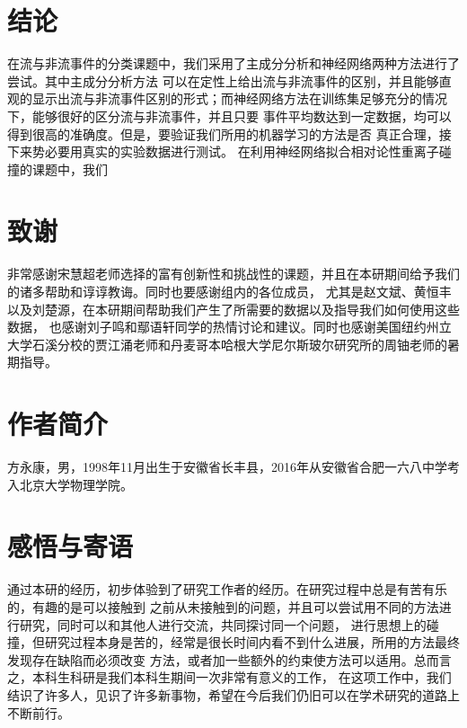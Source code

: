 \documentclass[aps,pre,12pt,preprint,onecolumn,showpacs,showkeys]{revtex4-1}
\begin{document}
\section{结论}
在流与非流事件的分类课题中，我们采用了主成分分析和神经网络两种方法进行了尝试。其中主成分分析方法
可以在定性上给出流与非流事件的区别，并且能够直观的显示出流与非流事件区别的形式；而神经网络方法在训练集足够充分的情况下，能够很好的区分流与非流事件，并且只要
事件平均数达到一定数据，均可以得到很高的准确度。但是，要验证我们所用的机器学习的方法是否
真正合理，接下来势必要用真实的实验数据进行测试。
在利用神经网络拟合相对论性重离子碰撞的课题中，我们

\section{致谢}
非常感谢宋慧超老师选择的富有创新性和挑战性的课题，并且在本研期间给予我们的诸多帮助和谆谆教诲。同时也要感谢组内的各位成员，
尤其是赵文斌、黄恒丰以及刘楚源，在本研期间帮助我们产生了所需要的数据以及指导我们如何使用这些数据，
也感谢刘子鸣和鄢语轩同学的热情讨论和建议。同时也感谢美国纽约州立大学石溪分校的贾江涌老师和丹麦哥本哈根大学尼尔斯玻尔研究所的周铀老师的暑期指导。



%
%
%
%
%
%
%
%
%
%
%
%
%
%
%



\section{\heiti{}作者简介}
方永康，男，1998年11月出生于安徽省长丰县，2016年从安徽省合肥一六八中学考入北京大学物理学院。

\section{\heiti{}感悟与寄语}
通过本研的经历，初步体验到了研究工作者的经历。在研究过程中总是有苦有乐的，有趣的是可以接触到
之前从未接触到的问题，并且可以尝试用不同的方法进行研究，同时可以和其他人进行交流，共同探讨同一个问题，
进行思想上的碰撞，但研究过程本身是苦的，经常是很长时间内看不到什么进展，所用的方法最终发现存在缺陷而必须改变
方法，或者加一些额外的约束使方法可以适用。总而言之，本科生科研是我们本科生期间一次非常有意义的工作，
在这项工作中，我们结识了许多人，见识了许多新事物，希望在今后我们仍旧可以在学术研究的道路上不断前行。
\end{document}
